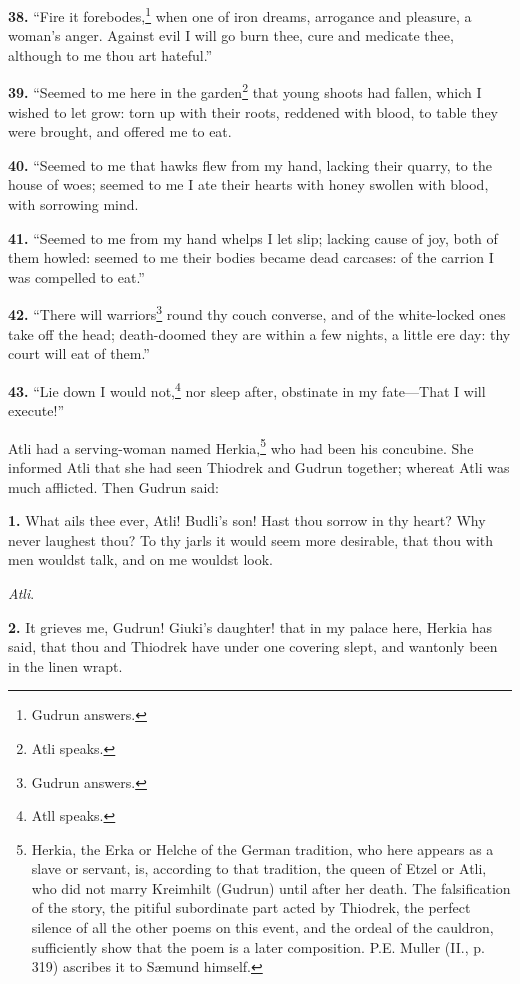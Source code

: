 \textbf{38.} ``Fire it forebodes,\footnote{Gudrun answers.} when one of iron dreams, arrogance and
pleasure, a woman's anger. Against evil I will go burn thee, cure and
medicate thee, although to me thou art hateful.''

\textbf{39.} ``Seemed to me here in the garden\footnote{Atli speaks.} that young shoots had
fallen, which I wished to let grow: torn up with their roots, reddened
with blood, to table they were brought, and offered me to eat.

\textbf{40.} ``Seemed to me that hawks flew from my hand, lacking their
quarry, to the house of woes; seemed to me I ate their hearts with
honey swollen with blood, with sorrowing mind.

\textbf{41.} ``Seemed to me from my hand whelps I let slip; lacking cause of
joy, both of them howled: seemed to me their bodies became dead
carcases: of the carrion I was compelled to eat.''

\textbf{42.} ``There will warriors\footnote{Gudrun answers.} round thy couch converse, and of the
white-locked ones take off the head; death-doomed they are within a
few nights, a little ere day: thy court will eat of them.''

\textbf{43.} ``Lie down I would not,\footnote{Atll speaks.} nor sleep after, obstinate in my
fate—That I will execute!''


Atli had a serving-woman named Herkia,\footnote{Herkia, the Erka or Helche of the German tradition, who
here appears as a slave or servant, is, according to that tradition,
the queen of Etzel or Atli, who did not marry Kreimhilt (Gudrun) until
after her death. The falsification of the story, the pitiful
subordinate part acted by Thiodrek, the perfect silence of all the
other poems on this event, and the ordeal of the cauldron,
sufficiently show that the poem is a later composition. P.E. Muller
(II., p. 319) ascribes it to Sæmund himself.} who had been his concubine.
She informed Atli that she had seen Thiodrek and Gudrun together;
whereat Atli was much afflicted. Then Gudrun said:

\textbf{1.} What ails thee ever, Atli! Budli's son! Hast thou sorrow in thy
heart? Why never laughest thou? To thy jarls it would seem more
desirable, that thou with men wouldst talk, and on me wouldst look.

\emph{Atli}.

\textbf{2.} It grieves me, Gudrun! Giuki's daughter! that in my palace here,
Herkia has said, that thou and Thiodrek have under one covering slept,
and wantonly been in the linen wrapt.

